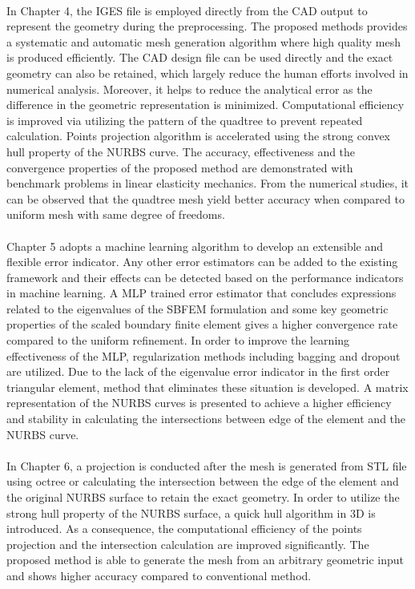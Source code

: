 \paragraph{}
In Chapter 4, the IGES file is employed directly from the CAD output to represent the geometry during the preprocessing.
The proposed methods provides a systematic and automatic mesh generation algorithm  where high quality mesh is produced efficiently.
The CAD design file can be used directly and the exact geometry can also be retained, which largely reduce the human efforts involved in numerical analysis.
Moreover, it helps to reduce the analytical error as the difference in the geometric representation is minimized.
Computational efficiency is improved via utilizing the pattern of the quadtree to prevent repeated calculation.
Points projection algorithm is accelerated using the strong convex hull property of the NURBS curve.
The accuracy, effectiveness and the convergence properties of the proposed method are demonstrated with benchmark problems in linear elasticity mechanics.
From the numerical studies, it can be observed that the quadtree mesh yield better accuracy when compared to uniform mesh with same degree of freedoms.

\paragraph{}
Chapter 5 adopts a machine learning algorithm to develop an extensible and flexible error indicator.
Any other error estimators can be added to the existing framework and their effects can be detected based on the performance indicators in machine learning.
A MLP trained error estimator that concludes expressions related to the eigenvalues of the SBFEM formulation and some key geometric properties of the scaled boundary finite element gives a higher convergence rate compared to the uniform refinement.
In order to improve the learning effectiveness of the MLP, regularization methods including bagging and dropout are utilized.
Due to the lack of the eigenvalue error indicator in the first order triangular element, method that eliminates these situation is developed.
A matrix representation of the NURBS curves is presented to achieve a higher efficiency and stability in calculating the intersections between edge of the element and the NURBS curve.

\paragraph{}
In Chapter 6, a projection is conducted after the mesh is generated from STL file using octree or calculating the intersection between the edge of the element and the original NURBS surface to retain the exact geometry.
In order to utilize the strong hull property of the NURBS surface, a quick hull algorithm in 3D is introduced.
As a consequence, the computational efficiency of the points projection and the intersection calculation are improved significantly.
The proposed method is able to generate the mesh from an arbitrary geometric input and shows higher accuracy compared to conventional method.


